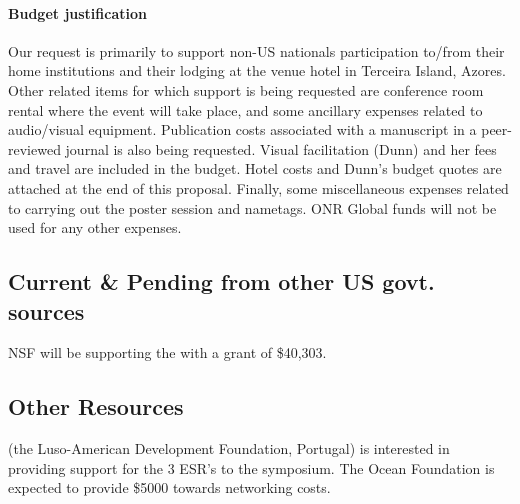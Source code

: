\paragraph{Budget justification} Our request is primarily to support
non-US nationals participation to/from their home institutions and
their lodging at the venue hotel in Terceira Island, Azores. Other
related items for which support is being requested are conference room
rental where the event will take place, and some ancillary expenses
related to audio/visual equipment. Publication costs associated with a
manuscript in a peer-reviewed journal is also being requested. Visual
facilitation (Dunn) and her fees and travel are included in the
budget. Hotel costs and Dunn's budget quotes are attached at the end
of this proposal. Finally, some miscellaneous expenses related to
carrying out the poster session and nametags. ONR Global funds will
not be used for any other expenses.

\subsection{Current \& Pending from other US govt. sources}

NSF will be supporting the \symp with a grant of \$40,303.

\subsection{Other Resources}

\fla (the Luso-American Development Foundation, Portugal) is
interested in providing support for the 3 ESR's to the symposium. The
Ocean Foundation is expected to provide \$5000 towards networking
costs.
